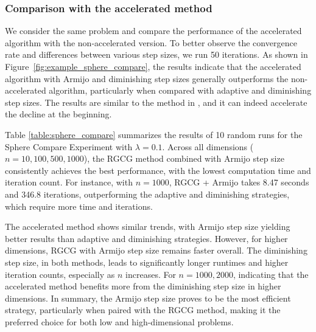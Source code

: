 \documentclass[pdflatex,sn-mathphys-num]{sn-jnl}%
\theoremstyle{definition} %
\theoremstyle{remark} %
\begin{document}
\subsubsection{Comparison with the accelerated method}



We consider the same problem and compare the performance of the accelerated algorithm with the non-accelerated version. To better observe the convergence rate and differences between various step sizes, we run 50 iterations. As shown in Figure~\ref {fig:example_sphere_compare}, the results indicate that the accelerated algorithm with Armijo and diminishing step sizes generally outperforms the non-accelerated algorithm, particularly when compared with adaptive and diminishing step sizes. The results are similar to the method in \cite{li2021momentum}, and it can indeed accelerate the decline at the beginning. 


Table \ref{table:sphere_compare} summarizes the results of 10 random runs for the Sphere Compare Experiment with \( \lambda = 0.1 \). Across all dimensions (\( n = 10, 100, 500, 1000 \)), the RGCG method combined with Armijo step size consistently achieves the best performance, with the lowest computation time and iteration count. For instance, with \( n = 1000 \), RGCG + Armijo takes 8.47 seconds and 346.8 iterations, outperforming the adaptive and diminishing strategies, which require more time and iterations.

The accelerated method shows similar trends, with Armijo step size yielding better results than adaptive and diminishing strategies. However, for higher dimensions, RGCG with Armijo step size remains faster overall. The diminishing step size, in both methods, leads to significantly longer runtimes and higher iteration counts, especially as \( n \) increases. 
For  $n = 1000, 2000$, indicating that the accelerated method benefits more from the diminishing step size in higher dimensions.
In summary, the Armijo step size proves to be the most efficient strategy, particularly when paired with the RGCG method, making it the preferred choice for both low and high-dimensional problems.
\end{document}
